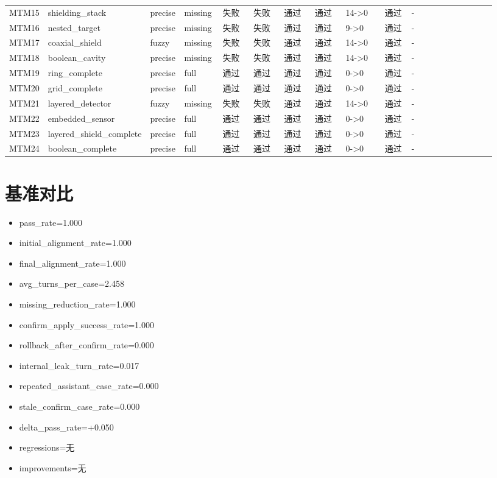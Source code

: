 \documentclass[11pt]{ctexart}
\begin{document}
\begin{longtable}{p{0.06\linewidth}p{0.08\linewidth}p{0.07\linewidth}p{0.08\linewidth}p{0.07\linewidth}p{0.07\linewidth}p{0.07\linewidth}p{0.07\linewidth}p{0.09\linewidth}p{0.06\linewidth}p{0.21\linewidth}}
MTM15 & shielding\_stack & precise & missing & 失败 & 失败 & 通过 & 通过 & 14->0 & 通过 & - \\
MTM16 & nested\_target & precise & missing & 失败 & 失败 & 通过 & 通过 & 9->0 & 通过 & - \\
MTM17 & coaxial\_shield & fuzzy & missing & 失败 & 失败 & 通过 & 通过 & 14->0 & 通过 & - \\
MTM18 & boolean\_cavity & precise & missing & 失败 & 失败 & 通过 & 通过 & 14->0 & 通过 & - \\
MTM19 & ring\_complete & precise & full & 通过 & 通过 & 通过 & 通过 & 0->0 & 通过 & - \\
MTM20 & grid\_complete & precise & full & 通过 & 通过 & 通过 & 通过 & 0->0 & 通过 & - \\
MTM21 & layered\_detector & fuzzy & missing & 失败 & 失败 & 通过 & 通过 & 14->0 & 通过 & - \\
MTM22 & embedded\_sensor & precise & full & 通过 & 通过 & 通过 & 通过 & 0->0 & 通过 & - \\
MTM23 & layered\_shield\_complete & precise & full & 通过 & 通过 & 通过 & 通过 & 0->0 & 通过 & - \\
MTM24 & boolean\_complete & precise & full & 通过 & 通过 & 通过 & 通过 & 0->0 & 通过 & - \\
\bottomrule
\end{longtable}
\section{基准对比}
\begin{itemize}
\item pass\_rate=1.000
\item initial\_alignment\_rate=1.000
\item final\_alignment\_rate=1.000
\item avg\_turns\_per\_case=2.458
\item missing\_reduction\_rate=1.000
\item confirm\_apply\_success\_rate=1.000
\item rollback\_after\_confirm\_rate=0.000
\item internal\_leak\_turn\_rate=0.017
\item repeated\_assistant\_case\_rate=0.000
\item stale\_confirm\_case\_rate=0.000
\item delta\_pass\_rate=+0.050
\item regressions=无
\item improvements=无
\end{itemize}
\appendix
\end{document}
